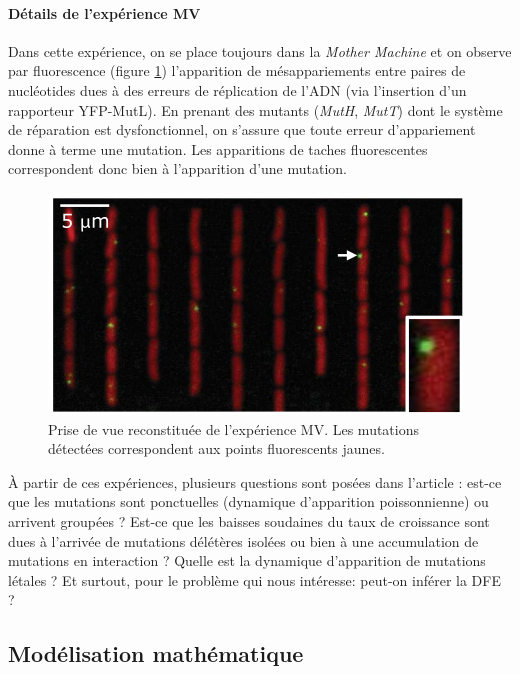 \documentclass[12pt]{article}
\begin{document}
\paragraph{Détails de l'expérience MV}

Dans cette expérience, on se place toujours dans la \emph{Mother Machine} et on observe par fluorescence (figure \ref{fig:MV}) l'apparition de mésappariements entre paires de nucléotides dues à des erreurs de réplication de l'ADN (via l'insertion d'un rapporteur YFP-MutL). En prenant des mutants (\emph{MutH}, \emph{MutT}) dont le système de réparation est dysfonctionnel, on s'assure que toute erreur d'appariement donne à terme une mutation. Les apparitions de taches fluorescentes correspondent donc bien à l'apparition d'une mutation.

\begin{figure}[h]
  \begin{center}
    \vspace{3mm}
    \includegraphics[scale=0.5]{../Img/Schema_MV.png}
  \end{center}
  \caption{\label{fig:MV}Prise de vue reconstituée de l'expérience MV. Les mutations détectées correspondent aux points fluorescents jaunes.}
\end{figure}

À partir de ces expériences, plusieurs questions sont posées dans l'article : est-ce que les mutations sont ponctuelles (dynamique d'apparition poissonnienne) ou arrivent groupées ? Est-ce que les baisses soudaines du taux de croissance sont dues à l’arrivée de mutations délétères isolées ou bien à une accumulation de mutations en interaction ? Quelle est la dynamique d’apparition de mutations létales ? Et surtout, pour le problème qui nous intéresse: peut-on inférer la DFE ?

\subsection{Modélisation mathématique}
\end{document}
